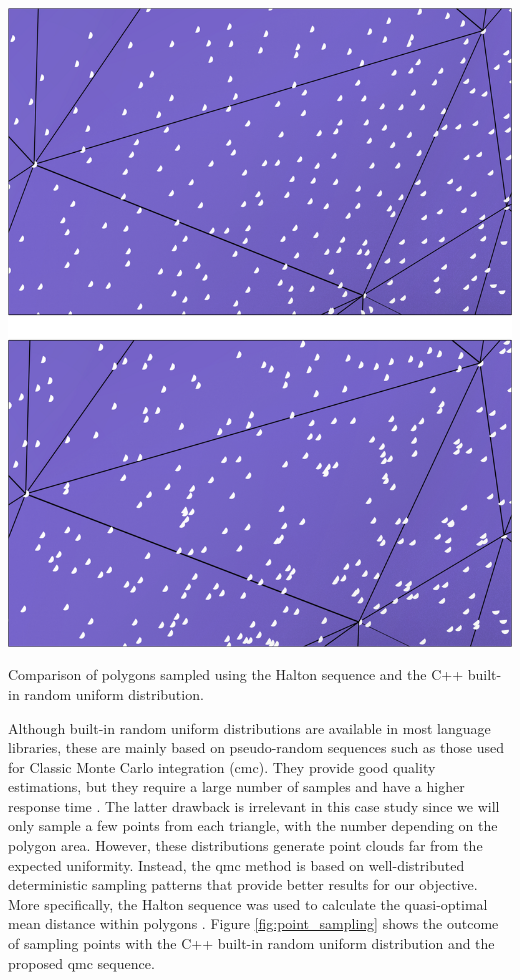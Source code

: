\begin{marginfigure}[0cm]
    \centering
    \includegraphics[width=\linewidth]{figs/lidar_optimization/point_sampling.png}
	\caption{Comparison of polygons sampled using the Halton sequence and the C++ built-in random uniform distribution.}
	\label{fig:point_sampling}
\end{marginfigure}
Although built-in random uniform distributions are available in most language libraries, these are mainly based on pseudo-random sequences such as those used for Classic Monte Carlo integration (\acrshort{cmc}). They provide good quality estimations, but they require a large number of samples and have a higher response time \cite{marques_optimal_2019}. The latter drawback is irrelevant in this case study since we will only sample a few points from each triangle, with the number depending on the polygon area. However, these distributions generate point clouds far from the expected uniformity. Instead, the \acrshort{qmc} method is based on well-distributed deterministic sampling patterns that provide better results for our objective. More specifically, the Halton sequence was used to calculate the quasi-optimal mean distance within polygons \cite{burkardt_halton_2010}. Figure \ref{fig:point_sampling} shows the outcome of sampling points with the C++ built-in random uniform distribution and the proposed \acrshort{qmc} sequence.

